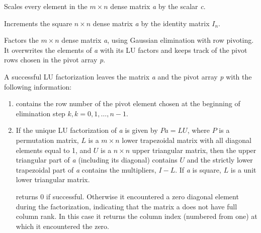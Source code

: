 \documentclass[letterpaper,10pt,english]{sphinxmanual}
\begin{document}

\begin{fulllineitems}
\label{linear_solvers/DLS:c.denseScale}
Scales every element in the \(m \times n\) dense matrix \emph{a} by
the scalar \emph{c}.

\end{fulllineitems}


\begin{fulllineitems}
\label{linear_solvers/DLS:c.denseAddIdentity}
Increments the square \(n \times n\) dense matrix \emph{a} by the
identity matrix \(I_n\).

\end{fulllineitems}


\begin{fulllineitems}
Factors the \(m \times n\) dense matrix \emph{a}, using Gaussian
elimination with row pivoting. It overwrites the elements of \emph{a}
with its LU factors and keeps track of the pivot rows chosen in the
pivot array \emph{p}.

A successful LU factorization leaves the matrix \emph{a} and the pivot
array \emph{p} with the following information:
\begin{enumerate}
\item {} 
 contains the row number of the pivot element chosen at
the beginning of elimination step \(k, k = 0, 1, \ldots,
n-1\).

\item {} 
If the unique LU factorization of \emph{a} is given by \(P a =
LU\), where \(P\) is a permutation matrix, \(L\) is a
\(m \times n\) lower trapezoidal matrix with all diagonal
elements equal to 1, and \(U\) is a \(n \times n\) upper
triangular matrix, then the upper triangular part of \emph{a}
(including its diagonal) contains \(U\) and the strictly
lower trapezoidal part of \emph{a} contains the multipliers,
\(I-L\). If \emph{a} is square, \(L\) is a unit lower
triangular matrix.

{\hyperref[linear_solvers/DLS:c.denseGETRF]{\emph{}}} returns 0 if successful. Otherwise it
encountered a zero diagonal element during the factorization,
indicating that the matrix a does not have full column rank. In
this case it returns the column index (numbered from one) at
which it encountered the zero.

\end{enumerate}

\end{fulllineitems}
\end{document}
